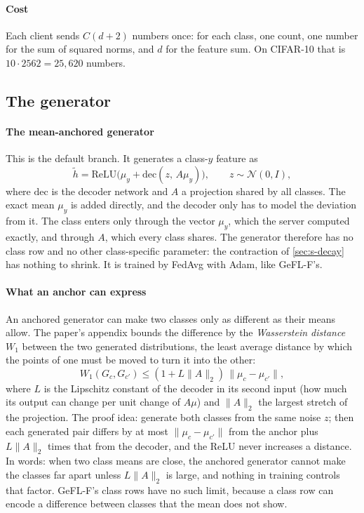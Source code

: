 \paragraph{Cost} Each client sends $C(d+2)$ numbers once: for each class, one count, one number for the sum of squared
norms, and $d$ for the feature sum. On CIFAR-10 that is $10\cdot2562=25{,}620$ numbers.

\subsection{The generator}\label{sec:s-gen}

\paragraph{The mean-anchored generator} This is the default branch. It generates a class-$y$ feature as
\[
\tilde h=\mathrm{ReLU}\big(\mu_y+\mathrm{dec}(z,\,A\mu_y)\big),\qquad z\sim\mathcal N(0,I),
\]
where $\mathrm{dec}$ is the decoder network and $A$ a projection shared by all classes. The exact mean $\mu_y$ is
added directly, and the decoder only has to model the deviation from it. The class enters only through the vector
$\mu_y$, which the server computed exactly, and through $A$, which every class shares. The generator therefore has no
class row and no other class-specific parameter: the contraction of \cref{sec:s-decay} has nothing to shrink. It is
trained by FedAvg with Adam, like GeFL-F's.

\paragraph{What an anchor can express} An anchored generator can make two classes only as different as their means
allow. The paper's appendix bounds the difference by the \emph{Wasserstein distance} $W_1$ between the two generated
distributions, the least average distance by which the points of one must be moved to turn it into the other:
\[
W_1(G_c,G_{c'})\le(1+L\|A\|_2)\,\|\mu_c-\mu_{c'}\|,
\]
where $L$ is the Lipschitz constant of the decoder in its second input (how much its output can change per unit change
of $A\mu$) and $\|A\|_2$ the largest stretch of the projection. The proof idea: generate both classes from the same
noise $z$; then each generated pair differs by at most $\|\mu_c-\mu_{c'}\|$ from the anchor plus $L\|A\|_2$ times that
from the decoder, and the ReLU never increases a distance. In words: when two class means are close, the anchored
generator cannot make the classes far apart unless $L\|A\|_2$ is large, and nothing in training controls that factor.
GeFL-F's class rows have no such limit, because a class row can encode a difference between classes that the mean does
not show.

